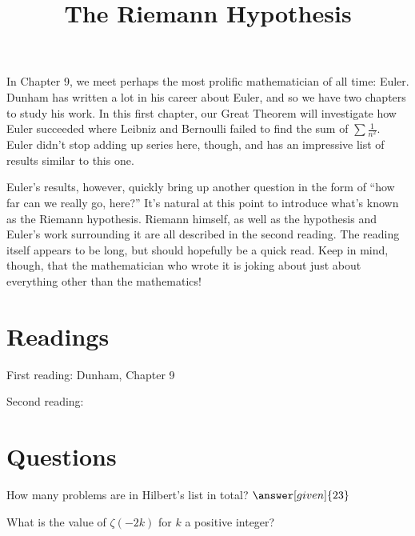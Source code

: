 \documentclass[nooutcomes]{ximera}
\title{The Riemann Hypothesis}
\begin{document}
\begin{abstract}
    
\end{abstract}
\maketitle

In Chapter 9, we meet perhaps the most prolific mathematician of all time: Euler.  Dunham has written a lot in his career about Euler, and so we have two chapters to study his work.  In this first chapter, our Great Theorem will investigate how Euler succeeded where Leibniz and Bernoulli failed to find the sum of $\sum \frac{1}{n^2}$.  Euler didn't stop adding up series here, though, and has an impressive list of results similar to this one.

Euler's results, however, quickly bring up another question in the form of ``how far can we really go, here?''  It's natural at this point to introduce what's known as the Riemann hypothesis.  Riemann himself, as well as the hypothesis and Euler's work surrounding it are all described in the second reading.  The reading itself appears to be long, but should hopefully be a quick read.  Keep in mind, though, that the mathematician who wrote it is joking about just about everything other than the mathematics!


\section{Readings}
First reading: Dunham, Chapter 9

Second reading: 



\section{Questions}

\begin{question}
How many problems are in Hilbert's list in total? $\answer[given]{23}$
\end{question}

\begin{question}
What is the value of $\zeta(-2k)$ for $k$ a positive integer?
\begin{multipleChoice}
\end{multipleChoice}
\end{question}


%
\end{document}
